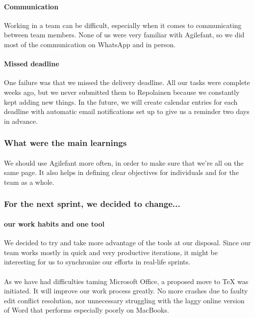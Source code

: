 \paragraph{Communication} Working in a team can be difficult, especially when it comes to communicating between team members. None of us were very familiar with Agilefant, so we did most of the communication on WhatsApp and in person.

\paragraph{Missed deadline} One failure was that we missed the delivery deadline. All our tasks were complete weeks ago, but we never submitted them to Repolainen because we constantly kept adding new things. In the future, we will create calendar entries for each deadline with automatic email notifications set up to give us a reminder two days in advance.

\subsubsection{What were the main learnings}

\paragraph{} We should use Agilefant more often, in order to make sure that we’re all on the same page. It also helps in defining clear objectives for individuals and for the team as a whole.

\subsubsection{For the next sprint, we decided to change...}

\paragraph{our work habits and one tool} We decided to try and take more advantage of the tools at our disposal. Since our team works mostly in quick and very productive iterations, it might be interesting for us to synchronize our efforts in real-life sprints.

\paragraph{} As we have had difficulties taming Microsoft Office, a proposed move to TeX was initiated. It will improve our work process greatly. No more crashes due to faulty edit conflict resolution, nor unnecessary struggling with the laggy online version of Word that performs especially poorly on MacBooks.

